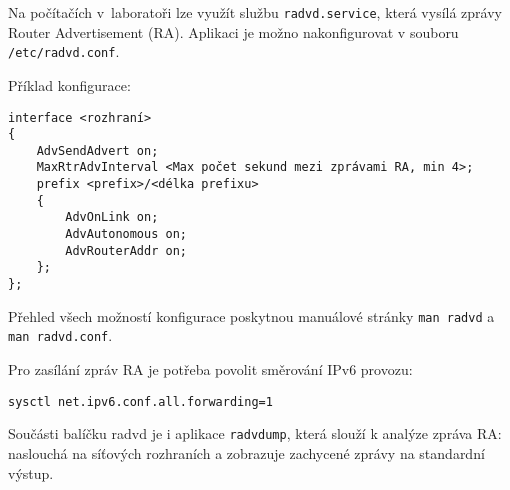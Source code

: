 Na počítačích v~laboratoři lze využít službu {\tt radvd.service}, která vysílá zprávy Router Advertisement (RA). Aplikaci je možno nakonfigurovat v souboru {\tt /etc/radvd.conf}.

Příklad konfigurace:
\begin{verbatim}
interface <rozhraní>
{
    AdvSendAdvert on;
    MaxRtrAdvInterval <Max počet sekund mezi zprávami RA, min 4>;
    prefix <prefix>/<délka prefixu>
    {
        AdvOnLink on;
        AdvAutonomous on;
        AdvRouterAddr on;
    };
};
\end{verbatim}
Přehled všech možností konfigurace poskytnou manuálové stránky {\tt man radvd} a {\tt man radvd.conf}.

Pro zasílání zpráv RA je potřeba povolit směrování IPv6 provozu:
\begin{verbatim}
sysctl net.ipv6.conf.all.forwarding=1
\end{verbatim}

Součásti balíčku radvd je i aplikace {\tt radvdump}, která slouží k analýze zpráva RA: naslouchá na síťových rozhraních a zobrazuje zachycené zprávy na standardní výstup.
